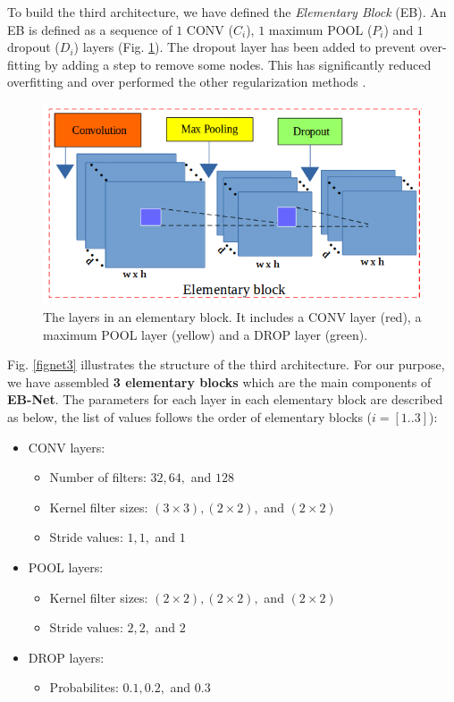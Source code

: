 \documentclass[review]{elsarticle}
\begin{document}
To build the third architecture, we have defined the \textit{Elementary Block} (EB). An EB is defined as a sequence of $1$ CONV ($C_{i}$), $1$ maximum POOL ($P_i$) and $1$ dropout ($D_i$) layers (Fig. \ref{figelementary}). The dropout layer has been added to prevent over-fitting by adding a step to remove some nodes. This has significantly reduced overfitting and over performed the other regularization methods \cite{srivastava2014dropout}.

\begin{figure}[h]
	\centering
	\includegraphics[scale=0.3]{images/elementary_block}
	\caption{The layers in an elementary block. It includes a CONV layer (red), a maximum POOL layer (yellow) and a DROP layer (green).}
	\label{figelementary}
\end{figure}

Fig. \ref{fignet3} illustrates the structure of the third architecture. For our purpose, we have assembled \textbf{3 elementary blocks} which are the main components of \textbf{EB-Net}. The parameters for each layer in each elementary block are described as below, the list of values follows the order of elementary blocks ($i = [1..3]$):
\begin{itemize}
	\item CONV layers:
	\begin{itemize}
		\item Number of filters: $32, 64, $ and $128$
		\item Kernel filter sizes: $(3 \times 3), (2 \times 2), $ and $(2 \times 2)$
		\item Stride values: $1, 1, $ and $1$ 
	\end{itemize}
	\item POOL layers:
		\begin{itemize}
			\item Kernel filter sizes: $(2 \times 2), (2 \times 2), $ and $(2 \times 2)$
			\item Stride values: $2, 2, $ and $2$
		\end{itemize}
	\item DROP layers:
		\begin{itemize}
			\item Probabilites: $0.1, 0.2, $ and $0.3$
		\end{itemize}
\end{itemize}
\end{document}

